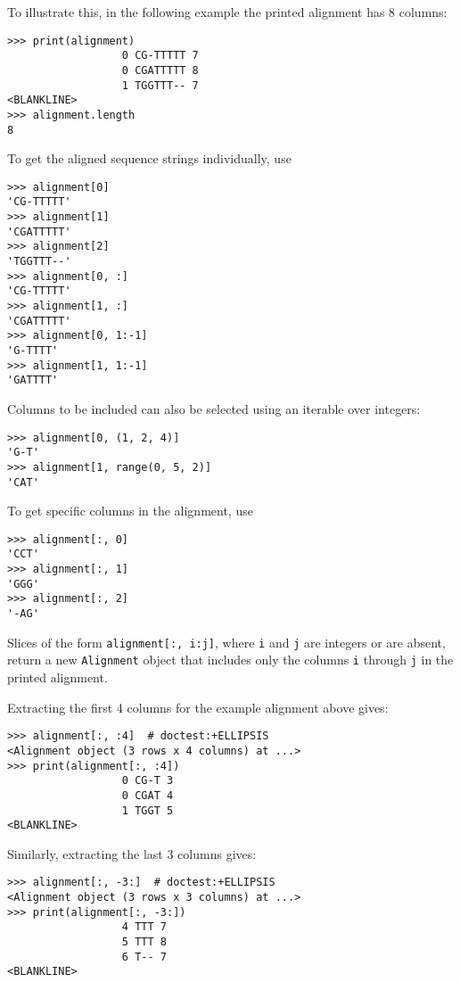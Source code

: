 To illustrate this, in the following example the printed alignment has 8 columns:

\begin{verbatim}
>>> print(alignment)
                  0 CG-TTTTT 7
                  0 CGATTTTT 8
                  1 TGGTTT-- 7
<BLANKLINE>
>>> alignment.length
8
\end{verbatim}

To get the aligned sequence strings individually, use
\begin{verbatim}
>>> alignment[0]
'CG-TTTTT'
>>> alignment[1]
'CGATTTTT'
>>> alignment[2]
'TGGTTT--'
>>> alignment[0, :]
'CG-TTTTT'
>>> alignment[1, :]
'CGATTTTT'
>>> alignment[0, 1:-1]
'G-TTTT'
>>> alignment[1, 1:-1]
'GATTTT'
\end{verbatim}

Columns to be included can also be selected using an iterable over integers:
\begin{verbatim}
>>> alignment[0, (1, 2, 4)]
'G-T'
>>> alignment[1, range(0, 5, 2)]
'CAT'
\end{verbatim}

To get specific columns in the alignment, use
\begin{verbatim}
>>> alignment[:, 0]
'CCT'
>>> alignment[:, 1]
'GGG'
>>> alignment[:, 2]
'-AG'
\end{verbatim}

Slices of the form \verb+alignment[:, i:j]+, where \verb+i+ and \verb+j+ are integers or are absent, return a new \verb+Alignment+ object that includes only the columns \verb+i+ through \verb+j+ in the printed alignment.

Extracting the first 4 columns for the example alignment above gives:
\begin{verbatim}
>>> alignment[:, :4]  # doctest:+ELLIPSIS
<Alignment object (3 rows x 4 columns) at ...>
>>> print(alignment[:, :4])
                  0 CG-T 3
                  0 CGAT 4
                  1 TGGT 5
<BLANKLINE>
\end{verbatim}

Similarly, extracting the last 3 columns gives:
\begin{verbatim}
>>> alignment[:, -3:]  # doctest:+ELLIPSIS
<Alignment object (3 rows x 3 columns) at ...>
>>> print(alignment[:, -3:])
                  4 TTT 7
                  5 TTT 8
                  6 T-- 7
<BLANKLINE>
\end{verbatim}

